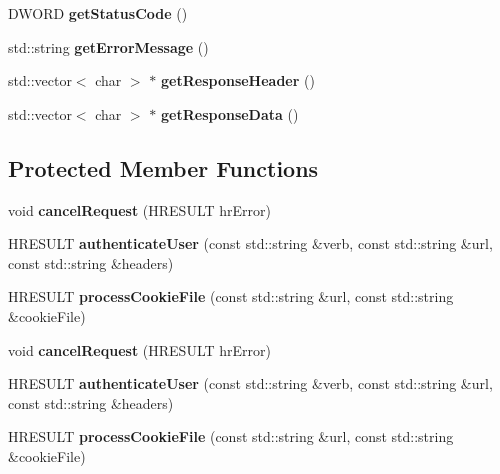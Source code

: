 \begin{DoxyCompactItemize}
D\+W\+O\+RD {\bfseries get\+Status\+Code} ()
\item 
\mbox{\label{classnetwork_1_1HttpConnection_afc1b2f084b6f97e39b1e5d71fc59676b}} 
std\+::string {\bfseries get\+Error\+Message} ()
\item 
\mbox{\label{classnetwork_1_1HttpConnection_ab09c61f438c0bcc07d0aa4291f14b424}} 
std\+::vector$<$ char $>$ $\ast$ {\bfseries get\+Response\+Header} ()
\item 
\mbox{\label{classnetwork_1_1HttpConnection_a4401c9cfbdc217edb0d96f13a899ad14}} 
std\+::vector$<$ char $>$ $\ast$ {\bfseries get\+Response\+Data} ()
\end{DoxyCompactItemize}
\subsection*{Protected Member Functions}
\begin{DoxyCompactItemize}
\item 
\mbox{\label{classnetwork_1_1HttpConnection_acbbc9659fcabb713411532832f05e2cb}} 
void {\bfseries cancel\+Request} (H\+R\+E\+S\+U\+LT hr\+Error)
\item 
\mbox{\label{classnetwork_1_1HttpConnection_afc4cdd8ed15507616fd4588b3bfe6c68}} 
H\+R\+E\+S\+U\+LT {\bfseries authenticate\+User} (const std\+::string \&verb, const std\+::string \&url, const std\+::string \&headers)
\item 
\mbox{\label{classnetwork_1_1HttpConnection_a89764ba707fad26033b476118ce4218c}} 
H\+R\+E\+S\+U\+LT {\bfseries process\+Cookie\+File} (const std\+::string \&url, const std\+::string \&cookie\+File)
\item 
\mbox{\label{classnetwork_1_1HttpConnection_acbbc9659fcabb713411532832f05e2cb}} 
void {\bfseries cancel\+Request} (H\+R\+E\+S\+U\+LT hr\+Error)
\item 
\mbox{\label{classnetwork_1_1HttpConnection_afc4cdd8ed15507616fd4588b3bfe6c68}} 
H\+R\+E\+S\+U\+LT {\bfseries authenticate\+User} (const std\+::string \&verb, const std\+::string \&url, const std\+::string \&headers)
\item 
\mbox{\label{classnetwork_1_1HttpConnection_a89764ba707fad26033b476118ce4218c}} 
H\+R\+E\+S\+U\+LT {\bfseries process\+Cookie\+File} (const std\+::string \&url, const std\+::string \&cookie\+File)
\end{DoxyCompactItemize}


